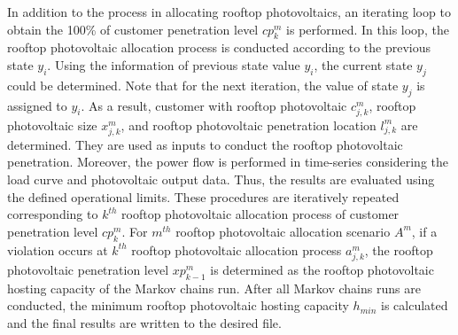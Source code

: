 In addition to the process in allocating rooftop photovoltaics, an iterating loop to obtain the 100\% of customer penetration level $cp^m_k$ is performed. In this loop, the rooftop photovoltaic allocation process is conducted according to the previous state $y_i$. Using the information of previous state value $y_i$, the current state $y_j$ could be determined. Note that for the next iteration, the value of state $y_j$ is assigned to $y_i$. As a result, customer with rooftop photovoltaic $c^m_{j,k}$, rooftop photovoltaic size $x^m_{j,k}$, and rooftop photovoltaic penetration location $l^m_{j,k}$ are determined. They are used as inputs to conduct the rooftop photovoltaic penetration.
Moreover, the power flow is performed in time-series considering the load curve and photovoltaic output data. Thus, the results are evaluated using the defined operational limits. These procedures are iteratively repeated corresponding to $k^{th}$ rooftop photovoltaic allocation process of customer penetration level $cp^m_k$. For $m^{th}$ rooftop photovoltaic allocation scenario $A^m$, if a violation occurs at $k^{th}$ rooftop photovoltaic allocation process $a^m_{j,k}$, the rooftop photovoltaic penetration level $\mathit{xp^m_{k-\text{1}}}$ is determined as the rooftop photovoltaic hosting capacity of the Markov chains run. After all Markov chains runs are conducted, the minimum rooftop photovoltaic hosting capacity $\mathit{h_{min}}$ is calculated and the final results are written to the desired file.
